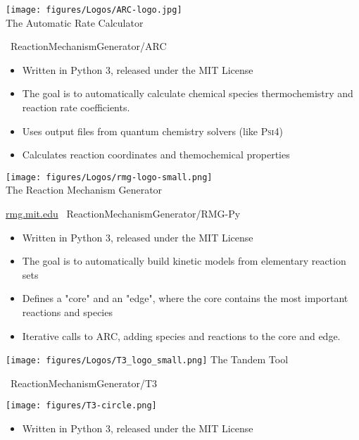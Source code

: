 \begin{frame}{
 \hspace{-5mm}
 \texttt{[image: figures/Logos/ARC-logo.jpg]}\\
 The Automatic Rate Calculator
}


\ghinlinelogo\ ReactionMechanismGenerator/ARC

\vspace{5mm}

\begin{itemize}
 \item Written in Python 3, released under the MIT License
 \item The goal is to automatically calculate chemical species thermochemistry and reaction rate coefficients.
 \item Uses output files from quantum chemistry solvers (like \textsc{Psi4})
 \item Calculates reaction coordinates and themochemical properties
\end{itemize}

\end{frame}


\begin{frame}{
 \hspace{-5mm}
 \texttt{[image: figures/Logos/rmg-logo-small.png]}\\
 The Reaction Mechanism Generator
}

\url{rmg.mit.edu}
\hspace{10mm}
\ghinlinelogo\ ReactionMechanismGenerator/RMG-Py

\vspace{5mm}

\begin{itemize}
 \item Written in Python 3, released under the MIT License
 \item The goal is to automatically build kinetic models from elementary reaction sets
 \item Defines a "core" and an "edge", where the core contains the most important reactions and species
 \item Iterative calls to \textsc{ARC}, adding species and reactions to the core and edge.
\end{itemize}

\end{frame}


\begin{frame}{
 \hspace{-5mm}
 \texttt{[image: figures/Logos/T3\_logo\_small.png]}
 The Tandem Tool
}

\ghinlinelogo\ ReactionMechanismGenerator/T3

{
\centering
\texttt{[image: figures/T3-circle.png]}
}

\begin{itemize}
 \item Written in Python 3, released under the MIT License
\end{itemize}

\end{frame}


